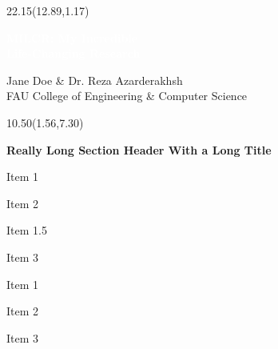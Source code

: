 \documentclass[final]{beamer}
\newcommand{\bodytext}[1]{
  \fontsize{30pt}{40pt}
  \selectfont
  \setlength{\parskip}{20pt}
  \raggedright
  #1%
}
\let\originalitemize\itemize
\let\endoriginalitemize\enditemize
\let\originalenumerate\enumerate
\let\endoriginalenumerate\endenumerate
\renewenvironment{itemize}{%
  \begingroup
  \fontsize{30pt}{30pt}\selectfont%
  \originalitemize
}{%
  \endoriginalitemize
  \endgroup
}
\renewenvironment{enumerate}{%
  \begingroup
  \fontsize{30pt}{30pt}\selectfont%
  \originalenumerate
}{%
  \endoriginalenumerate
  \endgroup
}
\newcommand{\sectiontext}[1]{%
  {\centering\fontsize{40pt}{48pt}\selectfont\textbf{\textcolor{headercolor}{#1}}\par}%
  \vspace{20pt}%
}
\newcommand{\titletext}[1]{%
  {\fontsize{80pt}{96pt}\selectfont\textbf{\textcolor{white}{#1}}\par}%
}
\newcommand{\authortext}[1]{%
  {\fontsize{54pt}{65pt}\selectfont\textcolor{authorcolor}{#1}\par}%
}
\newcommand{\postertextbox}[5]{%
  \begin{textblock}{#3}(#1,#2)
    \begin{minipage}[t][#4in][t]{#3in}
      \begin{posterbox}[#4in]
        #5
      \end{posterbox}
    \end{minipage}
  \end{textblock}
}
\newcommand{\titlebox}[6]{%
  \begin{textblock}{#3}(#1,#2)
    \begin{minipage}[t][#4in][c]{#3in}
      \centering
      #6
    \end{minipage}
  \end{textblock}
}
\begin{document}
\begin{frame}[t]

\titlebox{12.89}{1.17}{22.15}{4.83}{}{
  \titletext{MILCR: My Incredible \\ Life-Changing Research}
  \vspace{15pt}
  \authortext{Jane Doe \& Dr. Reza Azarderakhsh \\ FAU College of Engineering \& Computer Science}
}


\postertextbox{1.56}{7.30}{10.50}{27}{
  \sectiontext{Really Long Section Header With a Long Title}
  
  \bodytext{
    \begin{itemize}
      \item Item 1
      \item Item 2
        \begin{itemize}
       	  \item Item 1.5
        \end{itemize}
      \item Item 3
    \end{itemize}

    \begin{enumerate}
      \item Item 1
      \item Item 2
      \item Item 3
    \end{enumerate}

}}
\end{frame}
\end{document}
